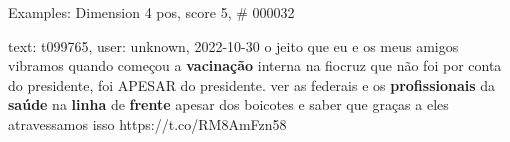 \begin{frame}{Examples: Dimension 4 pos, score 5, \# 000032}
\footnotesize
\begin{exampleblock}{text: t099765, user: unknown, 2022-10-30}
o jeito que eu e os meus amigos vibramos quando começou a \textbf{vacinação} 
interna na fiocruz que não foi por conta do presidente, foi APESAR do 
presidente. ver as federais e os \textbf{profissionais} da \textbf{saúde} na 
\textbf{linha} de \textbf{frente} apesar dos boicotes e saber que graças a eles 
atravessamos isso https://t.co/RM8AmFzn58 
\end{exampleblock}
\end{frame}

